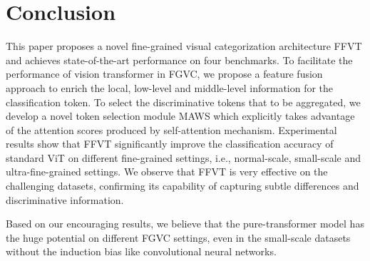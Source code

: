 \documentclass{bmvc2k}
\begin{document}
\section{Conclusion}
This paper proposes a novel fine-grained visual categorization architecture FFVT and achieves state-of-the-art performance on four benchmarks. To facilitate the performance of vision transformer in FGVC, we propose a feature fusion approach to enrich the local, low-level and middle-level information for the classification token. To select the discriminative tokens that to be aggregated, we develop a novel token selection module MAWS which explicitly takes advantage of the attention scores produced by self-attention mechanism. Experimental results show that FFVT significantly improve the classification accuracy of standard ViT on different fine-grained settings, i.e., normal-scale, small-scale and ultra-fine-grained settings. We observe that FFVT is very effective on the challenging datasets, confirming its capability of capturing subtle differences and discriminative information. 
\par
Based on our encouraging results, we believe that the pure-transformer model has the huge potential on different FGVC settings, even in the small-scale datasets without the induction bias like convolutional neural networks.

















\end{document}
